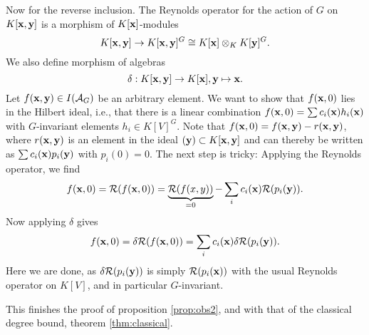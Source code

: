 \documentclass[../main.tex]{subfiles}
\begin{document}
Now for the reverse inclusion. The Reynolds operator for the action of $G$ on 
$K[\mathbf{x} ,\mathbf{y}]$ is a morphism of $K[\mathbf{x}]$-modules
\begin{equation*}
    K[\mathbf{x},\mathbf{y}] \to K[\mathbf{x}, \mathbf{y}]^G \cong K[\mathbf{x}] \otimes_K K[\mathbf{y}]^G.
\end{equation*}
We also define morphism of algebras
\begin{equation*}
    \delta: K[\mathbf{x},\mathbf{y}] \to K[\mathbf{x}], \mathbf{y} \mapsto \mathbf{x}.
\end{equation*}
Let $f(\mathbf{x},\mathbf{y}) \in I(\mathcal{A}_G)$ be an arbitrary element. We want to show that 
$f(\mathbf{x},0)$ lies in the Hilbert ideal, i.e., that there is a linear combination
$f(\mathbf{x}, 0) = \sum c_i(\mathbf{x}) h_i(\mathbf{x})$ with $G$-invariant elements $h_i \in K[V]^G$. 
Note that $f(\mathbf{x},0) = f(\mathbf{x},\mathbf{y}) - r(\mathbf{x},\mathbf{y})$, where $r(\mathbf{x},\mathbf{y})$ is an element
in the ideal $(\mathbf{y}) \subset K[\mathbf{x},\mathbf{y}]$ and can thereby be written as $\sum
c_i(\mathbf{x})p_i(\mathbf{y})$ with $p_i(0) = 0$. The next step is tricky: Applying the
Reynolds operator, we find 
\begin{equation*}
    f(\mathbf{x}, 0) = \mathcal{R}(f(\mathbf{x},0)) = \underbrace{\mathcal{R}(f(x,y))}_{=0} - \sum_i c_i(\mathbf{x})
    \mathcal{R}(p_i(\mathbf{y})).
\end{equation*}
Now applying $\delta$ gives
\begin{equation*}
    f(\mathbf{x},0) = \delta \mathcal{R}(f(\mathbf{x},0)) = \sum_i c_i(\mathbf{x}) \delta \mathcal{R}(p_i(\mathbf{y})).
\end{equation*}
Here we are done, as $\delta \mathcal{R}(p_i(\mathbf{y}))$ is simply $\mathcal{R}(p_i(\mathbf{x}))$ with the 
usual Reynolds operator on $K[V]$, and in particular $G$-invariant. 

This finishes the proof of proposition \ref{prop:obs2}, and with that of the
classical degree bound, theorem \ref{thm:classical}.
\end{document}
